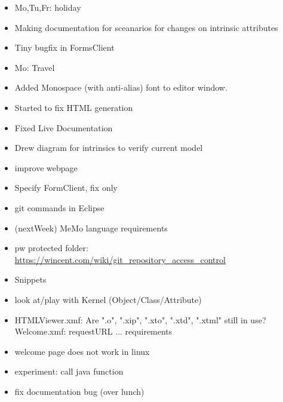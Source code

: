 \begin{itemize} 
\item Mo,Tu,Fr: holiday
\item Making documentation for sceanarios for changes on intrinsic attributes
\item Tiny bugfix in FormsClient
\end{itemize}

\begin{itemize} 
\item Mo: Travel
\item Added Monospace (with anti-alias) font to editor window.
\end{itemize}

\begin{itemize} 
\item Started to fix HTML generation
\end{itemize}

\begin{itemize} 
\item Fixed Live Documentation
\item Drew diagram for intrinsics to verify current model
\end{itemize}

\begin{itemize}
\item improve webpage
\item Specify FormClient, fix only
\item git commands in Eclipse
\item (nextWeek) MeMo language requirements
\item pw protected folder: \url{https://wincent.com/wiki/git_repository_access_control}
\item Snippets
\item look at/play with Kernel (Object/Class/Attribute)
\item HTMLViewer.xmf: Are ".o", ".xip", ".xto", ".xtd", ".xtml" still in use?
Welcome.xmf: requestURL ...
requirements
\item welcome page does not work in linux
\item experiment: call java function
\item fix documentation bug (over lunch)
\end{itemize}
